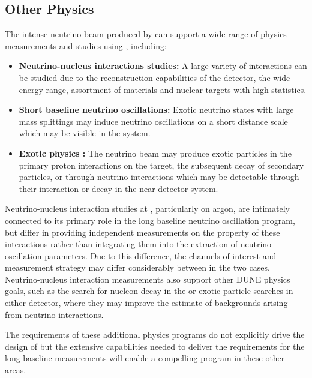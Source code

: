\subsection{Other Physics}
\label{intro:science:other}
The intense neutrino beam produced by  can support a wide range of physics measurements and studies using , including:
\begin{itemize}
    \item {\bf Neutrino-nucleus interactions studies:} A large variety of interactions can be studied due to the reconstruction capabilities of the detector, the wide energy range, assortment of materials and nuclear targets with high statistics. 
    \item {\bf Short baseline neutrino oscillations:} Exotic neutrino states with large mass splittings may induce neutrino oscillations on a short distance scale which may be visible in the  %
    system.
    \item {\bf Exotic physics  :} The  neutrino beam may produce exotic particles in the primary proton interactions on the target, the subsequent decay of secondary particles, or through neutrino interactions which may be detectable through their interaction or decay in the near detector system.
\end{itemize}
Neutrino-nucleus interaction studies at , particularly on argon, are intimately connected to its primary role in the long baseline neutrino oscillation program, but differ in providing independent measurements on the property of these interactions rather than integrating them into the extraction of neutrino oscillation parameters. Due to this difference, the channels of interest and measurement strategy may differ considerably between in the two cases. Neutrino-nucleus interaction measurements also support other DUNE physics goals, such as the search for nucleon decay in the  or exotic particle searches in either detector, where they may improve the estimate of backgrounds arising from neutrino interactions.

The requirements of these additional physics programs do not explicitly drive the design of  but the extensive capabilities needed to deliver the requirements for the long baseline measurements will enable a compelling program in these other areas.


